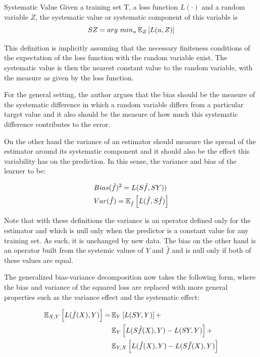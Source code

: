\begin{definition}{Systematic Value}
Given a training set $\mathrm{T}$, a loss function $L(\cdot)$ and a random variable $Z$, the systematic value or systematic component of this variable is
$$ SZ  =  arg \ min_u \operatorname{\mathbb{E}}_{Z} \left[ L(u,Z) \right]$$
\end{definition}

This definition is implicitly assuming that the necessary finiteness conditions of the expectation of the loss function with the random variable exist. The systematic value is then the nearest constant value to the random variable, with the measure as given by the loss function.


For the general setting, the author argues that the bias should be the measure of the systematic difference in which a random variable differs from a particular target value and it also should be the measure of how much this systematic difference contributes to the error.

On the other hand the variance of an estimator should measure the spread of the estimator around its systematic component and it should also be the effect this variability has on the prediction. In this sense, the variance and bias of the learner to be:

\begin{equation}
\begin{split}
& Bias(\hat{f})^2 = L(S\hat{f},SY)) \\
& Var(\hat{f}) = \operatorname{\mathbb{E}}_{\hat{f}} \left[  L(\hat{f}  , S\hat{f}) \right]
\end{split}
\end{equation}

Note that with these definitions the variance is an operator defined only for the estimator and which is null only when the predictor is a constant value for any training set. As such, it is unchanged by new data. The bias on the other hand is an operator built from the systemic values of $Y$ and $\hat{f}$ and is null only if both of these values are equal.


The generalized bias-variance decomposition now takes the following form, where the bias and variance of the squared loss are replaced with more general properties such as the variance effect and the systematic effect:

\begin{equation}
\begin{split}
\operatorname{\mathbb{E}}_{X,Y} \left[ L(\hat{f}(X),Y )\right] = &  \operatorname{\mathbb{E}}_{Y} \left[ L(SY,Y )\right] + \\
  &  \operatorname{\mathbb{E}}_{Y} \left[ L(S\hat{f}(X),Y ) - L(SY,Y )\right] + \\
  &  \operatorname{\mathbb{E}}_{Y,X} \left[ L(\hat{f}(X),Y ) - L(S\hat{f}(X),Y )\right]
\end{split}
\end{equation}

